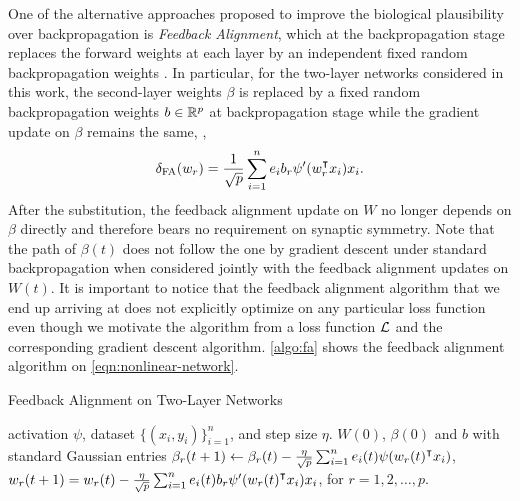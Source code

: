One of the alternative approaches proposed to improve the biological plausibility over backpropagation is \emph{Feedback Alignment}, which at the backpropagation stage replaces the forward weights at each layer by an independent fixed random backpropagation weights \citep{lillicrap2016random}. In particular, for the two-layer networks considered in this work, the second-layer weights $\beta$ is replaced by a fixed random backpropagation weights $b\in{\mathbb{R}^{p}}$ at backpropagation stage while the gradient update on $\beta$ remains the same, \ie,
\begin{align}\label{eqn:alignment-update}
    \dfa(w_r) = \frac{1}{\sqrt{p}} \sum_{i=1}^n e_i b_r\psi'(w_r\transpose x_i)x_i.
\end{align}
After the substitution, the feedback alignment update on $W$ no longer depends on $\beta$ directly and therefore bears no requirement on synaptic symmetry. Note that the path of $\beta(t)$ does not follow the one by gradient descent under standard backpropagation when considered jointly with the feedback alignment updates on $W(t)$. It is important to notice that the feedback alignment algorithm that we end up arriving at does not explicitly optimize on any particular loss function even though we motivate the algorithm from a loss function $\mathcal{L}$ and the corresponding gradient descent algorithm.
\cref{algo:fa} shows the feedback alignment algorithm on \eqref{eqn:nonlinear-network}.

\begin{algorithm}[H]
\centering
\caption{Feedback Alignment on Two-Layer Networks}\label{algo:fa}
    \begin{algorithmic}[1]
        \Require activation $\psi$, dataset $\{(x_i,y_i)\}_{i=1}^n$, and step size $\eta$.
         $W(0)$, $\beta(0)$ and $b$ with standard Gaussian entries
            \State $\beta_r(t+1) \gets \beta_r(t) - \frac{\eta}{\sqrt p} \sum_{i=1}^n e_i(t)\psi(w_r(t)\transpose x_i)$,
            \State $w_r(t+1) = w_r(t) - \frac{\eta}{\sqrt{p}} \sum_{i=1}^n e_i(t) b_r\psi'(w_r(t)\transpose x_i)x_i$, for $r=1,2,\ldots,p$.
        \EndWhile
    \end{algorithmic}    
\end{algorithm}%


